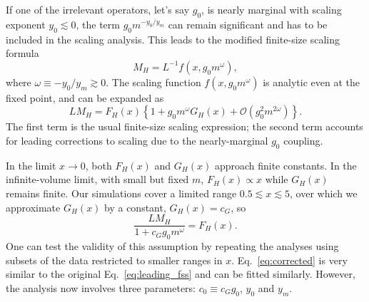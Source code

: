 \documentclass[aps,prl,twocolumn,]{revtex4}  %
\newcommand{\cO}{\ensuremath{\mathcal O} }
\newcommand{\lsim}{\ensuremath{\lesssim} }
\newcommand{\eq}[1]{Eq.~\ref{#1}}
\begin{document}
If one of the irrelevant operators, let's say $g_0$, is nearly marginal with scaling exponent $y_0 \lsim 0$, the term $g_0 m^{-y_0 / y_m}$ can remain significant and has to be included in the scaling analysis.
This leads to the modified finite-size scaling formula
\begin{equation}
  M_H = L^{-1} f\left(x, g_0 m^{\omega}\right),
\end{equation}
where $\omega \equiv -y_0 / y_m \gtrsim 0$.
The scaling function $f\left(x, g_0 m^{\omega}\right)$ is analytic even at the fixed point, and can be expanded as
\begin{equation}
  \label{eq:expansion}
  L M_H = F_H(x)\left\{1 + g_0 m^{\omega} G_H(x) + \cO\left(g_0^2 m^{2\omega}\right)\right\}.
\end{equation}
The first term is the usual finite-size scaling expression; the second term accounts for leading corrections to scaling due to the nearly-marginal $g_0$ coupling.


In the limit $x \to 0$, both $F_H(x)$ and $G_H(x)$ approach finite constants.
In the infinite-volume limit, with small but fixed $m$, $F_H(x)\propto x$ while $G_H(x)$ remains finite.
Our simulations cover a limited range $0.5 \lsim x \lsim 5$, over which we approximate $G_H(x)$ by a constant, $G_H(x) = c_G$, so 
\begin{equation}
  \label{eq:corrected}
  \frac{L M_H}{1 + c_G g_0 m^{\omega}} = F_H(x).
\end{equation}
One can test the validity of this assumption by repeating the analyses using subsets of the data restricted to smaller ranges in $x$.
\eq{eq:corrected} is very similar to the original \eq{eq:leading_fss} and can be fitted similarly.
However, the analysis now involves three parameters: $c_0 \equiv c_G g_0$, $y_0$ and $y_m$.

\end{document}

